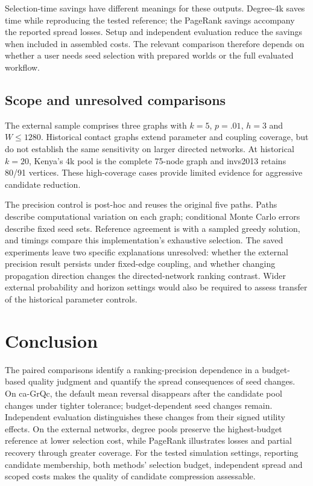 \documentclass[smallextended]{svjour3}
\begin{document}
Selection-time savings have different meanings for these outputs. Degree-4k saves time while reproducing the tested reference; the PageRank savings accompany the reported spread losses. Setup and independent evaluation reduce the savings when included in assembled costs. The relevant comparison therefore depends on whether a user needs seed selection with prepared worlds or the full evaluated workflow.

\subsection{Scope and unresolved comparisons}
The external sample comprises three graphs with $k=5$, $p=.01$, $h=3$ and $W\le1280$. Historical contact graphs extend parameter and coupling coverage, but do not establish the same sensitivity on larger directed networks. At historical $k=20$, Kenya's 4k pool is the complete 75-node graph and invs2013 retains 80/91 vertices. These high-coverage cases provide limited evidence for aggressive candidate reduction.

The precision control is post-hoc and reuses the original five paths. Paths describe computational variation on each graph; conditional Monte Carlo errors describe fixed seed sets. Reference agreement is with a sampled greedy solution, and timings compare this implementation's exhaustive selection. The saved experiments leave two specific explanations unresolved: whether the external precision result persists under fixed-edge coupling, and whether changing propagation direction changes the directed-network ranking contrast. Wider external probability and horizon settings would also be required to assess transfer of the historical parameter controls.

\section{Conclusion}
The paired comparisons identify a ranking-precision dependence in a budget-based quality judgment and quantify the spread consequences of seed changes. On ca-GrQc, the default mean reversal disappears after the candidate pool changes under tighter tolerance; budget-dependent seed changes remain. Independent evaluation distinguishes these changes from their signed utility effects. On the external networks, degree pools preserve the highest-budget reference at lower selection cost, while PageRank illustrates losses and partial recovery through greater coverage. For the tested simulation settings, reporting candidate membership, both methods' selection budget, independent spread and scoped costs makes the quality of candidate compression assessable.
\end{document}
